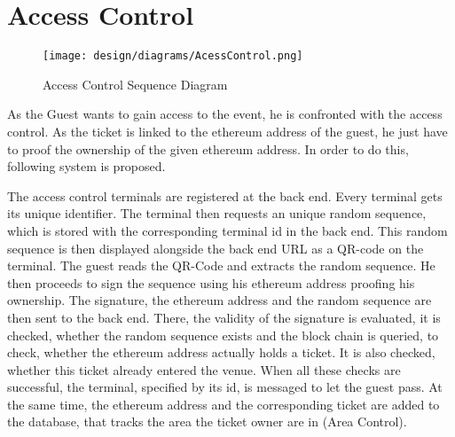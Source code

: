 \section{Access Control}\label{section:access-control}



\begin{figure}[H]
    \centering
    \texttt{[image: design/diagrams/AcessControl.png]}
    \caption{Access Control Sequence Diagram}
    \label{fig:access-controll}
\end{figure}

As the Guest wants to gain access to the event, he is confronted with the access control. As the ticket is linked to the ethereum address of the guest, he just have to proof the ownership of the given ethereum address. In order to do this, following system is proposed.

The access control terminals are registered at the back end. Every terminal gets its unique identifier. The terminal then requests an unique random sequence, which is stored with the corresponding terminal id in the back end. This random sequence is then displayed alongside the back end URL as a QR-code on the terminal. The guest reads the QR-Code and extracts the random sequence. He then proceeds to sign the sequence using his ethereum address proofing his ownership. The signature, the ethereum address and the random sequence are then sent to the back end. There, the validity of the signature is evaluated, it is checked, whether the random sequence exists and the block chain is queried, to check, whether the ethereum address actually holds a ticket. It is also checked, whether this ticket already entered the venue. When all these checks are successful, the terminal, specified by its id, is messaged to let the guest pass. At the same time, the ethereum address and the corresponding ticket are added to the database, that tracks the area the ticket owner are in (Area Control).

